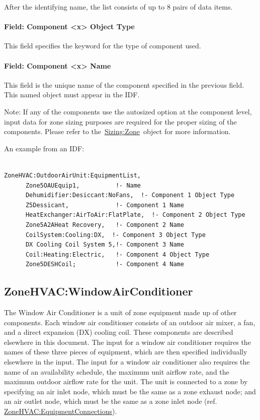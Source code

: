 After the identifying name, the list consists of up to 8 pairs of data items.

\paragraph{Field: Component \textless{}x\textgreater{} Object Type}\label{field-component-x-object-type-000}

This field specifies the keyword for the type of component used.

\paragraph{Field: Component \textless{}x\textgreater{} Name}\label{field-component-x-name-000}

This field is the unique name of the component specified in the previous field. This named object must appear in the IDF.

Note: If any of the components use the autosized option at the component level, input data for zone sizing purposes are required for the proper sizing of the components. Please refer to the~\hyperref[sizingzone]{Sizing:Zone}~object for more information.

An example from an IDF:

\begin{lstlisting}

ZoneHVAC:OutdoorAirUnit:EquipmentList,
      Zone5OAUEquip1,          !- Name
      Dehumidifier:Desiccant:NoFans,  !- Component 1 Object Type
      Z5Dessicant,             !- Component 1 Name
      HeatExchanger:AirToAir:FlatPlate,  !- Component 2 Object Type
      Zone5A2AHeat Recovery,   !- Component 2 Name
      CoilSystem:Cooling:DX,  !- Component 3 Object Type
      DX Cooling Coil System 5,!- Component 3 Name
      Coil:Heating:Electric,   !- Component 4 Object Type
      Zone5DESHCoil;           !- Component 4 Name
\end{lstlisting}

\subsection{ZoneHVAC:WindowAirConditioner}\label{zonehvacwindowairconditioner}

The Window Air Conditioner is a unit of zone equipment made up of other components. Each window air conditioner consists of an outdoor air mixer, a fan, and a direct expansion (DX) cooling coil. These components are described elsewhere in this document. The input for a window air conditioner requires the names of these three pieces of equipment, which are then specified individually elsewhere in the input. The input for a window air conditioner also requires the name of an availability schedule, the maximum unit airflow rate, and the maximum outdoor airflow rate for the unit. The unit is connected to a zone by specifying an air inlet node, which must be the same as a zone exhaust node; and an air outlet node, which must be the same as a zone inlet node (ref. \hyperref[zonehvacequipmentconnections]{ZoneHVAC:EquipmentConnections}).


